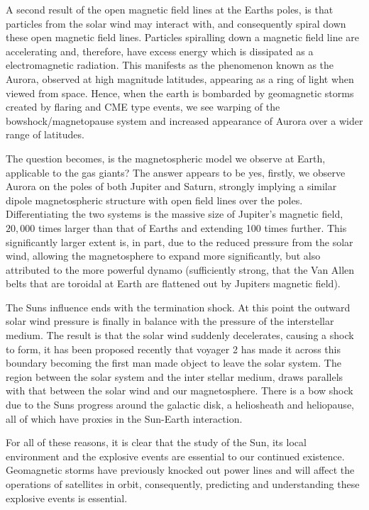 A second result of the open magnetic field lines at the Earths poles, is that particles from the solar wind may interact with, and consequently spiral down these open magnetic field lines.
Particles spiralling down a magnetic field line are accelerating and, therefore, have excess energy which is dissipated as a electromagnetic radiation.
This manifests as the phenomenon known as the Aurora, observed at high magnitude latitudes, appearing as a ring of light when viewed from space.
Hence, when the earth is bombarded by geomagnetic storms created by flaring and CME type events, we see warping of the bowshock/magnetopause system and increased appearance of Aurora over a wider range of latitudes.

The question becomes, is the magnetospheric model we observe at Earth, applicable to the gas giants?
The answer appears to be yes, firstly, we observe Aurora on the poles of both Jupiter and Saturn, strongly implying a similar dipole magnetospheric structure with open field lines over the poles.
Differentiating the two systems is the massive size of Jupiter's magnetic field, $20,000$ times larger than that of Earths and extending 100 times further.
This significantly larger extent is, in part, due to the reduced pressure from the solar wind, allowing the magnetosphere to expand more significantly, but also attributed to the more powerful dynamo (sufficiently strong, that the Van Allen belts that are toroidal at Earth are flattened out by Jupiters magnetic field).

The Suns influence ends with the termination shock.
At this point the outward solar wind pressure is finally in balance with the pressure of the interstellar medium.
The result is that the solar wind suddenly decelerates, causing a shock to form, it has been proposed recently that voyager 2 has made it across this boundary becoming the first man made object to leave the solar system.
The region between the solar system and the inter stellar medium, draws parallels with that between the solar wind and our magnetosphere.
There is a bow shock due to the Suns progress around the galactic disk, a heliosheath and heliopause, all of which have proxies in the Sun-Earth interaction.

For all of these reasons, it is clear that the study of the Sun, its local environment and the explosive events are essential to our continued existence.
Geomagnetic storms have previously knocked out power lines and will affect the operations of satellites in orbit, consequently, predicting and understanding these explosive events is essential.

